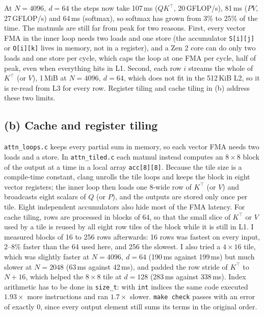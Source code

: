 \documentclass[11pt,a4paper]{article}
\begin{document}
At $N=4096,\ d=64$ the steps now take 107\,ms ($QK^\top$, 20\,GFLOP/s), 81\,ms ($PV$,
27\,GFLOP/s) and 64\,ms (softmax), so softmax has grown from 3\% to 25\% of the time. The matmuls
are still far from peak for two reasons. First, every vector FMA in the inner loop needs two
loads and one store (the accumulator \texttt{S[i][j]} or \texttt{O[i][k]} lives in memory, not
in a register), and a Zen 2 core can do only two loads and one store per cycle, which caps the
loop at one FMA per cycle, half of peak, even when everything hits in L1. Second, each row $i$
streams the whole of $K^\top$ (or $V$), 1\,MiB at $N=4096,\ d=64$, which does not fit in the
512\,KiB L2, so it is re-read from L3 for every row. Register tiling and cache tiling in (b)
address these two limits.

\subsection*{(b) Cache and register tiling}

\texttt{attn\_loops.c} keeps every partial sum in memory, so each vector FMA needs two loads and
a store. In \texttt{attn\_tiled.c} each matmul instead computes an $8 \times 8$ block of the
output at a time in a local array \texttt{acc[8][8]}. Because the tile size is a compile-time
constant, clang unrolls the tile loops and keeps the block in eight vector registers; the inner
loop then loads one 8-wide row of $K^\top$ (or $V$) and broadcasts eight scalars of $Q$ (or $P$),
and the outputs are stored only once per tile. Eight independent accumulators also hide most of
the FMA latency. For cache tiling, rows are processed in blocks of 64, so that the small slice of
$K^\top$ or $V$ used by a tile is reused by all eight row tiles of the block while it is still
in L1. I measured blocks of 16 to 256 rows afterwards: 16 rows was fastest on every input, 2--8\%
faster than the 64 used here, and 256 the slowest. I also tried a
$4 \times 16$ tile, which was slightly faster at $N=4096,\ d=64$ (190\,ms against 199\,ms) but
much slower at $N=2048$ (63\,ms against 42\,ms), and padded the row stride of $K^\top$ to
$N+16$, which helped the $8 \times 8$ tile at $d=128$ (283\,ms against 338\,ms). Index
arithmetic has to be done in \texttt{size\_t}: with \texttt{int} indices the same code executed
$1.93\times$ more instructions and ran $1.7\times$ slower. \texttt{make check} passes with an
error of exactly 0, since every output element still sums its terms in the original order.
\end{document}
